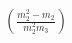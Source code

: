 \documentclass[preview]{standalone}
\begin{document}
\begin{align*}
\left(\frac{m_2^2 - m_2}{m_2^2 m_3}\right)
\end{align*}
\end{document}

